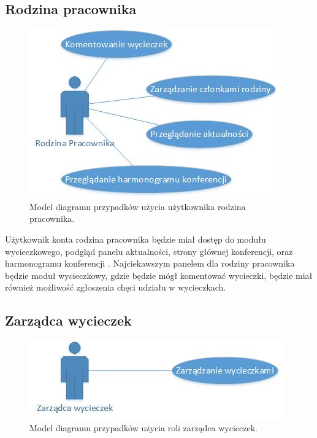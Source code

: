 \subsection{Rodzina pracownika}

\begin{figure}[!tb]
    \centering
    \includegraphics{rodzina.jpg}
    \caption{Model diagramu przypadków użycia użytkownika rodzina pracownika.}
    \label{fig:rodzina}
\end{figure}

Użytkownik konta rodzina pracownika będzie miał dostęp do modułu wycieczkowego, podgląd panelu aktualności, strony głównej konferencji, oraz harmonogramu konferencji . \newline
Najciekawszym panelem dla rodziny pracownika będzie moduł wycieczkowy, gdzie będzie mógł komentować wycieczki, będzie miał również możliwość zgłoszenia chęci udziału w wycieczkach.

\subsection{Zarządca wycieczek}

\begin{figure}[!tb]
    \centering
    \includegraphics{zarzadcawycieczek.jpg}
    \caption{Model diagramu przypadków użycia roli zarządca wycieczek.}
    \label{fig:zarzadcawycieczek}
\end{figure}

